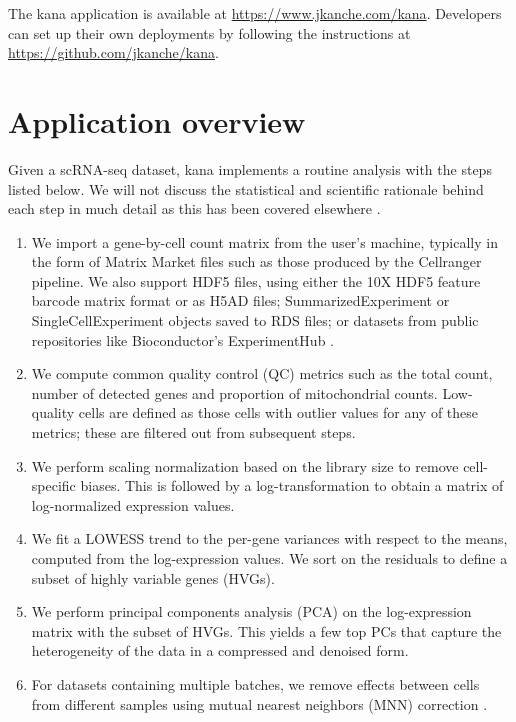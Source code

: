 \documentclass{article}
\begin{document}
The kana application is available at \url{https://www.jkanche.com/kana}.
Developers can set up their own deployments by following the instructions at \url{https://github.com/jkanche/kana}.

\section{Application overview}

Given a scRNA-seq dataset, kana implements a routine analysis with the steps listed below.
We will not discuss the statistical and scientific rationale behind each step in much detail as this has been covered elsewhere \cite{oscabook}.

\begin{enumerate}
\item We import a gene-by-cell count matrix from the user's machine, typically in the form of Matrix Market files such as those produced by the Cellranger pipeline.
We also support HDF5 files, using either the 10X HDF5 feature barcode matrix format or as H5AD files; 
SummarizedExperiment or SingleCellExperiment objects \cite{amezquita2020orchestrating} saved to RDS files;
or datasets from public repositories like Bioconductor's ExperimentHub \cite{morgan2019experimenthub}.
\item We compute common quality control (QC) metrics such as the total count, number of detected genes and proportion of mitochondrial counts.
Low-quality cells are defined as those cells with outlier values for any of these metrics; these are filtered out from subsequent steps.
\item We perform scaling normalization based on the library size to remove cell-specific biases.
This is followed by a log-transformation to obtain a matrix of log-normalized expression values.
\item We fit a LOWESS trend \cite{cleveland1979robust} to the per-gene variances with respect to the means, computed from the log-expression values.
We sort on the residuals to define a subset of highly variable genes (HVGs). 
\item We perform principal components analysis (PCA) on the log-expression matrix with the subset of HVGs.
This yields a few top PCs that capture the heterogeneity of the data in a compressed and denoised form.
\item For datasets containing multiple batches, we remove effects between cells from different samples using mutual nearest neighbors (MNN) correction \cite{haghverdi2018batch}. 

\end{enumerate}
\end{document}
